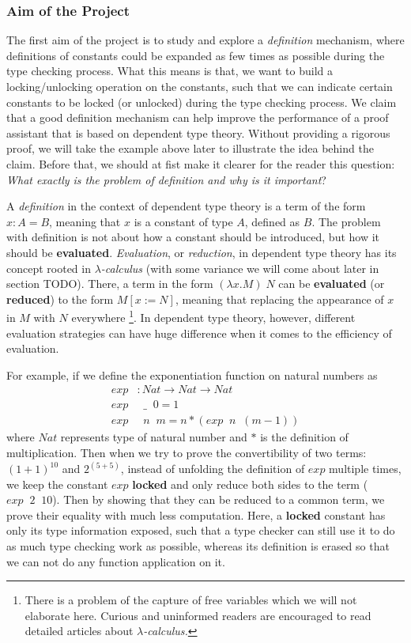 \documentclass{article}
\theoremstyle{remark}
\begin{document}
\subsubsection{Aim of the Project}
The first aim of the project is to study and explore a \emph{definition} mechanism, where definitions of constants could be expanded as few times as possible during the type checking process. What this means is that, we want to build a locking/unlocking operation on the constants, such that we can indicate certain constants to be locked (or unlocked) during the type checking process. We claim that a good definition mechanism can help improve the performance of a proof assistant that is based on dependent type theory. Without providing a rigorous proof, we will take the example above later to illustrate the idea behind the claim. Before that, we should at fist make it clearer for the reader this question: \emph{What exactly is the problem of definition and why is it important}?

A \emph{definition} in the context of dependent type theory is a term of the form $x : A = B$, meaning that $x$ is a constant of type $A$, defined as $B$. The problem with definition is not about how a constant should be introduced, but how it should be \textbf{evaluated}. \emph{Evaluation}, or \emph{reduction}, in dependent type theory has its concept rooted in \emph{$\lambda$-calculus} \cite{barendregt1984lambda} (with some variance we will come about later in section TODO). There, a term in the form $(\lambda x . M) \;N$ can be \textbf{evaluated} (or \textbf{reduced}) to the form $M[x := N]$, meaning that replacing the appearance of $x$ in $M$ with $N$ everywhere \footnote{There is a problem of the capture of free variables which we will not elaborate here. Curious and uninformed readers are encouraged to read detailed articles about \emph{$\lambda$-calculus.}}. In dependent type theory, however, different evaluation strategies can have huge difference when it comes to the efficiency of evaluation. 

For example, if we define the exponentiation function on natural numbers as
\begin{align*}
  exp &: Nat \to Nat \to Nat \\
  exp &\;\; \_\;\; 0 = 1 \\
  exp &\;\; n \;\; m = n * (exp \;\; n \;\; (m - 1))
\end{align*}
where $Nat$ represents type of natural number and $*$ is the definition of multiplication. Then when we try to prove the convertibility of two terms: $(1 + 1)^{10}$ and $2 ^ {(5+5)}$, instead of unfolding the definition of $exp$ multiple times, we keep the constant $exp$ \textbf{locked} and only reduce both sides to the term ($exp \;\; 2 \;\; 10$). Then by showing that they can be reduced to a common term, we prove their equality with much less computation. Here, a \textbf{locked} constant has only its type information exposed, such that a type checker can still use it to do as much type checking work as possible, whereas its definition is erased so that we can not do any function application on it.
\end{document}
